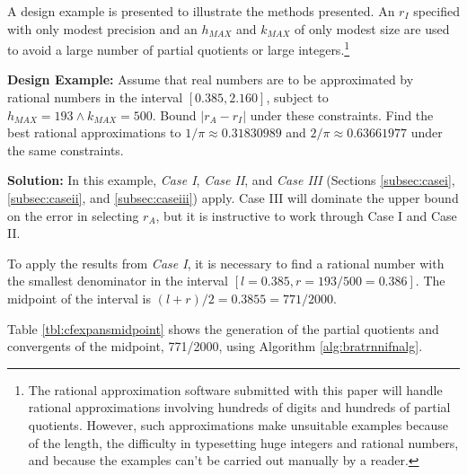 \documentclass{esub2acm}
\begin{document}
A design example is presented to illustrate the methods presented.
An $r_I$ specified with only modest precision and an
$h_{MAX}$ and $k_{MAX}$ of only modest size are used to avoid a large
number of partial quotients or large integers.\footnote{The rational
approximation
software submitted with this paper will handle rational approximations involving hundreds
of digits and hundreds of partial quotients.  However, such approximations make unsuitable
examples because of the length, the difficulty in typesetting huge integers and
rational numbers, and because
the examples can't be carried out manually by a reader.}

\textbf{Design Example:}
Assume that real numbers are to be approximated by rational numbers
in the interval $[0.385, 2.160]$, subject to $h_{MAX} = 193 \wedge k_{MAX}=500$.
Bound $|r_A - r_I|$ under these constraints.  Find the best rational
approximations to $1/\pi \approx 0.31830989$ and
$2/\pi \approx 0.63661977$ under the same constraints.

\textbf{Solution:}
In this example, \emph{Case I}, \emph{Case II}, and \emph{Case III}
(Sections \ref{subsec:casei}, \ref{subsec:caseii}, and \ref{subsec:caseiii}) apply.  Case III
will dominate the upper bound on the error in selecting $r_A$,
but it is instructive to work through Case I and Case II.

To apply the results from \emph{Case I}, it is necessary to find
a rational number with the smallest denominator in the interval
$[l = 0.385, r = 193/500 = 0.386]$.  The midpoint of the interval
is $(l+r)/2 = 0.3855 = 771/2000$.

Table \ref{tbl:cfexpansmidpoint} shows the generation of the partial quotients and convergents of the
midpoint, 771/2000, using Algorithm \ref{alg:bratrnnifnalg}.
\end{document}
